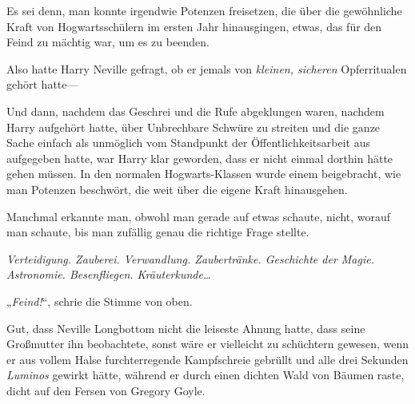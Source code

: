 Es sei denn, man konnte irgendwie Potenzen freisetzen, die über die gewöhnliche Kraft von Hogwartsschülern im ersten Jahr hinausgingen, etwas, das für den Feind zu mächtig war, um es zu beenden.

Also hatte Harry Neville gefragt, ob er jemals von \emph{kleinen, sicheren} Opferritualen gehört hatte—

Und dann, nachdem das Geschrei und die Rufe abgeklungen waren, nachdem Harry aufgehört hatte, über Unbrechbare Schwüre zu streiten und die ganze Sache einfach als unmöglich vom Standpunkt der Öffentlichkeitsarbeit aus aufgegeben hatte, war Harry klar geworden, dass er nicht einmal dorthin hätte gehen müssen. In den normalen Hogwarts-Klassen wurde einem beigebracht, wie man Potenzen beschwört, die weit über die eigene Kraft hinausgehen.

Manchmal erkannte man, obwohl man gerade auf etwas schaute, nicht, worauf man schaute, bis man zufällig genau die richtige Frage stellte.

\emph{Verteidigung. Zauberei. Verwandlung. Zaubertränke. Geschichte der Magie. Astronomie. Besenfliegen. Kräuterkunde…}

„\emph{Feind!}“, schrie die Stimme von oben.

\later

Gut, dass Neville Longbottom nicht die leiseste Ahnung hatte, dass seine Großmutter ihn beobachtete, sonst wäre er vielleicht zu schüchtern gewesen, wenn er aus vollem Halse furchterregende Kampfschreie gebrüllt und alle drei Sekunden \emph{Luminos} gewirkt hätte, während er durch einen dichten Wald von Bäumen raste, dicht auf den Fersen von Gregory Goyle.

